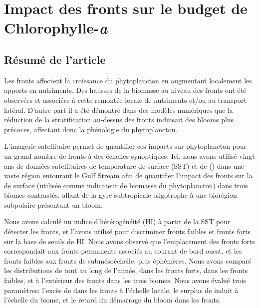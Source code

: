 
\chapter{Impact des fronts sur le budget de Chlorophylle-\textit{a}}
\addChpLof
\label{chp:res-chl}
\graphicspath{{resources/res_chl}}

{
  \hypersetup{hidelinks}
  \minitoc%
}


\section{Résumé de l'article}
\label{sec:resume-article}

Les fronts affectent la croissance du phytoplancton en augmentant localement les apports en nutriments.
Des hausses de la biomasse au niveau des fronts ont été observées et associées à cette remontée locale de nutriments et/ou au transport latéral.
D'autre part il a été démontré dans des modèles numériques que la réduction de la stratification au-dessus des fronts induisait des blooms plus précoces, affectant donc la phénologie du phytoplancton.

L'imagerie satellitaire permet de quantifier ces impacts sur phytoplancton pour un grand nombre de fronts à des échelles synoptiques.
Ici, nous avons utilisé vingt ans de données satellitaires de température de surface (SST) et de  () dans une vaste région entourant le Gulf Stream afin de quantifier l'impact des fronts sur la  de surface (utilisée comme indicateur de biomasse du phytoplancton) dans trois biomes contrastés, allant de la gyre subtropicale oligotrophe à une biorégion subpolaire présentant un bloom.

Nous avons calculé un indice d'hétérogénéité (HI) à partir de la SST pour détecter les fronts, et l'avons utilisé pour discriminer fronts faibles et fronts forts sur la base de seuils de HI.
Nous avons observé que l'emplacement des fronts forts correspondait aux fronts permanents associés au courant de bord ouest, et les fronts faibles aux fronts de submésoéchelle, plus éphémères.
Nous avons comparé les distributions de  tout au long de l'année, dans les fronts forts, dans les fronts faibles, et à l'extérieur des fronts dans les trois biomes.
Nous avons évalué trois paramètres: l'excès de  dans les fronts à l'échelle locale, le surplus de  induit à l'échelle du biome, et le retard du démarrage du bloom dans les fronts.

